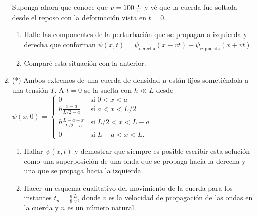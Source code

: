 \documentclass[11pt,spanish,a4paper]{article}
\begin{document}
\begin{enumerate}
\begin{minipage}[c][1.1cm][t]{0.54\textwidth}
\end{minipage}
	Suponga ahora que conoce que $v = \SI{100}{\metre\over\second}$ y vé que la cuerda fue soltada desde el reposo con la deformación vista en $t=0$.
\begin{enumerate}
	\item Halle las componentes de la perturbación que se propagan a izquierda y derecha que conforman $\psi(x,t) = \psi_\text{derecha} (x - v t ) + \psi_\text{izquierda} ( x + v t )$.
	\item Comparé esta situación con la anterior.
\end{enumerate}



\item (*) Ambos extremos de una cuerda de densidad $\mu$ están fijos sometiéndola a una tensión $T$.
A $t=0$ se la suelta con $h \ll L$ desde
$
\psi(x,0)=\begin{cases}
0 & \mbox{si }0<x<a\\
h\frac{x-a}{L/2-a} & \mbox{si }a<x<L/2\\
h\frac{L-a-x}{L/2-a} & \mbox{si }L/2<x<L-a\\
0 & \mbox{si }L-a<x<L .
\end{cases}
$
\begin{enumerate}
	\item Hallar $\psi(x,t)$ y demostrar que siempre es posible escribir esta solución como una superposición de una onda que se propaga hacia la derecha y una que se propaga hacia la izquierda.
	\item Hacer un esquema cualitativo del movimiento de la cuerda para los instantes $t_n = \frac{n}{8} \frac{L}{v}$, donde $v$ es la velocidad de propagación de las ondas en la cuerda y $n$ es un número natural.
\end{enumerate}



\end{enumerate}
\end{document}
